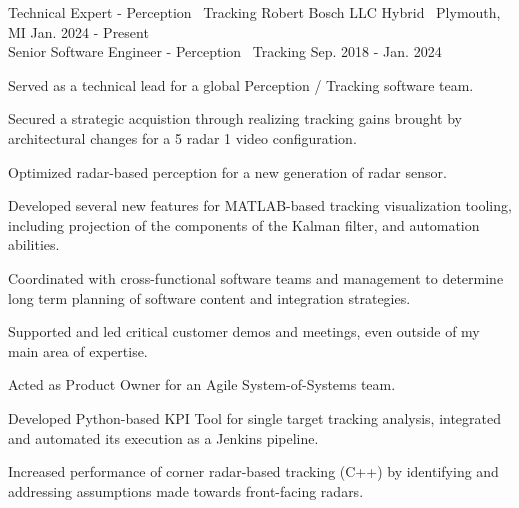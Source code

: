 

\begin{cventries}

  \cventry
    {Technical Expert - Perception \textbar\ Tracking} %
    {Robert Bosch LLC} %
    {Hybrid \textbar\ Plymouth, MI} %
    {Jan. 2024 - Present} %
    {
    }
  \\\cventrytitle
    {Senior Software Engineer - Perception \textbar\ Tracking} %
    {} %
    {} %
    {Sep. 2018 - Jan. 2024} %
    {
      \begin{cvitems} %
        \item {Served as a technical lead for a global Perception / Tracking software team.}
        \item {Secured a strategic acquistion through realizing tracking gains brought by architectural changes for a 5 radar 1 video configuration.}
        \item {Optimized radar-based perception for a new generation of radar sensor.}
        \item {Developed several new features for MATLAB-based tracking visualization tooling, including projection of the components of the Kalman filter, and automation abilities.}
        \item {Coordinated with cross-functional software teams and management to determine long term planning of software content and integration strategies.}
        \item {Supported and led critical customer demos and meetings, even outside of my main area of expertise.}
        \item {Acted as Product Owner for an Agile System-of-Systems team.}
        \item {Developed Python-based KPI Tool for single target tracking analysis, integrated and automated its execution as a Jenkins pipeline.}
        \item {Increased performance of corner radar-based tracking (C++) by identifying and addressing assumptions made towards front-facing radars.}

\end{cvitems}}
\end{cventries}
